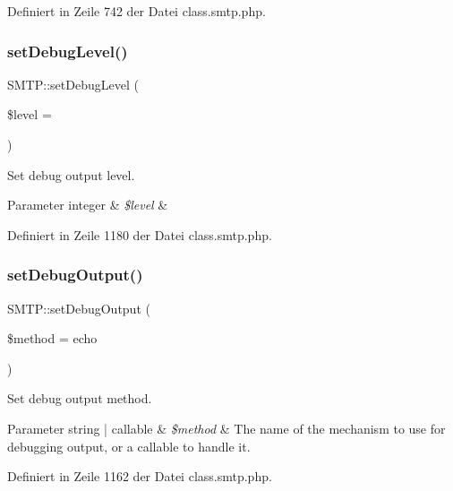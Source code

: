 Definiert in Zeile 742 der Datei class.\+smtp.\+php.

\mbox{\label{class_s_m_t_p_abc3c6e130e15cbaeee22fa4afc0f5551}} 
\subsubsection{\texorpdfstring{set\+Debug\+Level()}{setDebugLevel()}}
{\footnotesize\ttfamily S\+M\+T\+P\+::set\+Debug\+Level (\begin{DoxyParamCaption}\item[{}]{\$level = {} }\end{DoxyParamCaption})}

Set debug output level. 
\begin{DoxyParams}[1]{Parameter}
integer & {\em \$level} & \\
\hline
\end{DoxyParams}


Definiert in Zeile 1180 der Datei class.\+smtp.\+php.

\mbox{\label{class_s_m_t_p_a02967d173ffe3360a21681063bf492ef}} 
\subsubsection{\texorpdfstring{set\+Debug\+Output()}{setDebugOutput()}}
{\footnotesize\ttfamily S\+M\+T\+P\+::set\+Debug\+Output (\begin{DoxyParamCaption}\item[{}]{\$method = {\ttfamily \textquotesingle{}echo\textquotesingle{}} }\end{DoxyParamCaption})}

Set debug output method. 
\begin{DoxyParams}[1]{Parameter}
string | callable & {\em \$method} & The name of the mechanism to use for debugging output, or a callable to handle it. \\
\hline
\end{DoxyParams}


Definiert in Zeile 1162 der Datei class.\+smtp.\+php.

\mbox{\label{class_s_m_t_p_a1c7ce9a21d7e4fd5281b7115d81dd0d2}} 
